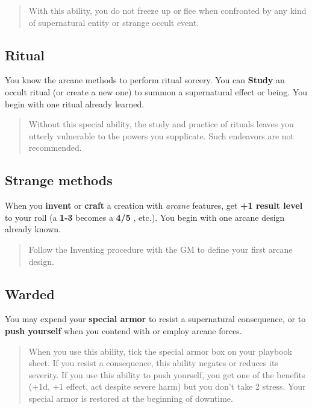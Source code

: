 \documentclass[11pt,oneside]{book}
\newcommand{\gameterm}[1]{\textbf{#1}}
\begin{document}
\begin{quote}
	With this ability, you do not freeze up or flee when confronted by any kind of supernatural entity or strange occult event.
\end{quote} 

\subsection{Ritual}

You know the arcane methods to perform ritual sorcery. You can \gameterm{Study}  an occult ritual (or create a new one) to summon a supernatural effect or being. You begin with one ritual already learned.

\begin{quote}
	Without this special ability, the study and practice of rituals leaves you utterly vulnerable to the powers you supplicate. Such endeavors are not recommended.
\end{quote} 

\subsection{Strange methods}

When you \textbf{invent} or \textbf{craft} a creation with \emph{arcane} features, get \textbf{+1 result level} to your roll (a \gameterm{1-3}  becomes a \gameterm{4/5} , etc.). You begin with one arcane design already known.

\begin{quote}
	Follow the Inventing procedure with the GM  to define your first arcane design.
\end{quote} 

\subsection{Warded}

You may expend your \textbf{special armor} to resist a supernatural consequence, or to \textbf{push yourself} when you contend with or employ arcane forces.

\begin{quote}
	When you use this ability, tick the special armor box on your playbook sheet. If you resist a consequence, this ability negates or reduces its severity. If you use this ability to push yourself, you get one of the benefits (+1d, +1 effect, act despite severe harm) but you don’t take 2 stress. Your special armor is restored at the beginning of downtime.
\end{quote} 
\end{document}
